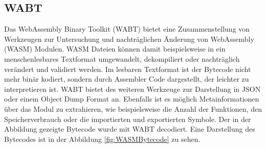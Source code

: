 \subsection{WABT}
\label{subsec:WABT}

Das WebAssembly Binary Toolkit (WABT) bietet eine Zusammenstellung von Werkzeugen zur Untersuchung und nachträglichen Änderung von WebAssembly (WASM) Modulen.
WASM Dateien können damit beispielsweise in ein menschenlesbares Textformat umgewandelt, dekompiliert oder nachträglich verändert und validiert werden.
Im lesbaren Textformat ist der Bytecode nicht mehr binär kodiert, sondern durch Assembler Code dargestellt, der leichter zu interpretieren ist.
WABT bietet des weiteren Werkzeuge zur Darstellung in JSON oder einem Object Dump Format an.
Ebenfalls ist es möglich Metainformationen über das Modul zu extrahieren, wie beispielsweise die Anzahl der Funktionen, den Speicherverbrauch oder die importierten und exportierten Symbole.
\cite{wabtGitHub}
Der in der Abbildung gezeigte Bytecode wurde mit WABT decodiert.
Eine Darstellung des Bytecodes ist in der Abbildung \ref{fig:WASMBytecode} zu sehen.